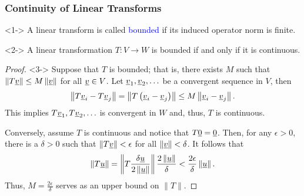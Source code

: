 \documentclass[10pt,english,aspectratio=169]{beamer}
\begin{document}
\begin{frame} \frametitle{Continuity of Linear Transforms}

\vspace{-1mm}

\begin{definition}<1->
A linear transform is called \textcolor{blue}{bounded} if its induced operator norm is finite.
\end{definition}

\vspace{-1mm}

\begin{theorem}<2->
A linear transformation $T \colon V \rightarrow W$ is bounded if and only if it is continuous.
\end{theorem}

\vspace{-1mm}

\begin{proof}<3->
Suppose that $T$ is bounded; that is, there exists $M$ such that  $\left\| T \underline{v} \right\| \leq M \left\| \underline{v} \right\|$ for all $\underline{v} \in V$.
Let $\underline{v}_1, \underline{v}_2, \ldots$ be a convergent sequence in $V$, then \vspace{-2mm}
\begin{equation*}
\left\| T \vecnot{v}_i - T \vecnot{v}_j \right\|
= \left\| T \left( \vecnot{v}_i - \vecnot{v}_j \right) \right\|
\leq  M \left\| \vecnot{v}_i - \vecnot{v}_j \right\| . \vspace{-1mm}
\end{equation*}
This implies $T \underline{v}_1, T \underline{v}_2, \ldots$ is convergent in $W$ and, thus, $T$ is continuous. \vspace{1mm}

Conversely, assume $T$ is continuous and notice that $T \underline{0} = \underline{0}$.
Then, for any $\epsilon > 0$, there is a $\delta>0$ such that $\| T \underline{v} \| < \epsilon$ for all $\| \underline{v} \| < \delta$.
It follows that \vspace{-2mm}
\begin{equation*}
\left\| T \vecnot{u} \right\|
= \left\| T \frac{ \delta \vecnot{u} }{2 \left\| \vecnot{u} \right\| } \right\|
\frac{ 2 \left\| \vecnot{u} \right\| }{ \delta }
< \frac{2 \epsilon}{ \delta } \left\| \vecnot{u} \right\|. \vspace{-3mm}
\end{equation*}
Thus, $M = \frac{2 \epsilon}{\delta}$ serves as an upper bound on $\|T\|$.
\vspace{-1mm}
\end{proof}

\end{frame}
\end{document}
